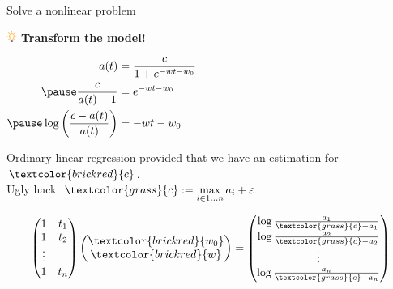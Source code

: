 \documentclass[UKenglish,aspectratio=169]{beamer}
\newcommand\unknown[1]{\textcolor{brickred}{#1}}
\newcommand\known[1]{\textcolor{grass}{#1}}
\begin{document}
\begin{frame}{Solve a nonlinear problem}
\begin{minipage}{.4\linewidth}
\includegraphics[width=10pt]{../manuscript/img/idea.png} \textbf{Transform the model!}

\vspace{1ex}
$\begin{aligned}
a(t) &= \frac{c}{1+e^{-wt - w_0}} \\ \pause
\frac{c}{a(t)-1} & = e^{-wt-w_0}  \\ \pause
\log\left(\frac{c-a(t)}{a(t)}\right) & = -wt-w_0
\end{aligned}
$
\end{minipage}
\qquad
\begin{minipage}{.5\linewidth}
\end{minipage}

\pause
\vspace{1ex}
Ordinary linear regression provided that we have an estimation for $\unknown{c}$.\\
Ugly hack: $\known{c}:=\max\limits_{i\in 1\dots n} a_i + \varepsilon$

\pause
$$
\begin{pmatrix}
1 & t_1 \\
1 & t_2 \\
\vdots & \\
1 & t_n
\end{pmatrix}
\begin{pmatrix}
\unknown{w_0}\\
\unknown{w}
\end{pmatrix}
=
\begin{pmatrix}
\log\frac{a_1}{\known{c} - a_1}\\
\log\frac{a_2}{\known{c} - a_2}\\
\vdots \\
\log\frac{a_n}{\known{c} - a_n}
\end{pmatrix}
$$
\pause
\end{frame}
\end{document}
